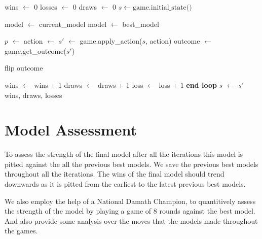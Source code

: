 \begin{algorithm}[htb]
    \begin{algorithmic}[1]
          \State wins $\gets$ 0
          \State losses $\gets$ 0
          \State draws $\gets$ 0
          \Repeat
            \State $s \gets \text{game.initial\_state()}$ 
            \Loop

                  \State model $\gets$ current\_model
                \Else
                  \State model $\gets$ best\_model
                \EndIf

                \State $p$ $\gets$ 
                \State action $\gets$ 
                \State $s'$ $\gets$ game.apply\_action($s$, action)
                    \State outcome $\gets$ game.get\_outcome($s'$)

                      \State flip outcome
                    \EndIf

                      \State wins $\gets$ wins + 1
                      \State draws $\gets$ draws + 1
                      \State loss $\gets$ loss + 1
                    \EndIf
                    \State \textbf{end loop}
                \EndIf
                \State $s$ $\gets$ $s'$
            \EndLoop
          \State \Return wins, draws, losses
        \EndFunction
    \end{algorithmic}
    \label{alg:evaluate}
\end{algorithm}

\section{Model Assessment}

To assess the strength of the final model after all the iterations this model is pitted against the all the previous best models. We save the previous best models throughout all the iterations. The wins of the final model should trend downwards as it is pitted from the earliest to the latest previous best models.

We also employ the help of a National Damath Champion, to quantitively assess the strength of the model by playing a game of $8$ rounds against the best model. And also provide some analysis over the moves that the models made throughout the games.

